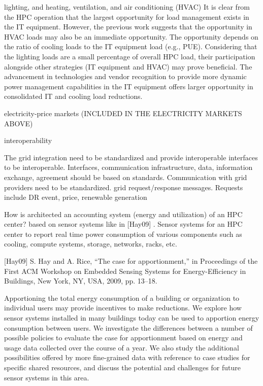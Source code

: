 lighting, and heating, ventilation, and air conditioning (HVAC)
It is clear from the HPC operation that the largest opportunity for load management exists in the IT equipment.
However, the previous work suggests that the opportunity in HVAC loads may also be an immediate opportunity. 
The opportunity depends on the ratio of cooling loads to the IT equipment load (e.g., PUE).
Considering that the lighting loads are a small percentage of overall HPC load, their participation alongside other strategies (IT equipment and HVAC) may prove beneficial. 
The advancement in technologies and vendor recognition to provide more dynamic power management capabilities in the IT equipment offers larger opportunity in consolidated IT and cooling load reductions.

electricity-price markets (INCLUDED IN THE ELECTRICITY MARKETS ABOVE)

interoperability

The grid integration need to be standardized and provide interoperable
interfaces to be interoperable. Interfaces, communication infrastructure,
data, information exchange, agreement should be based on standards.
Communication with grid providers need to be standardized. grid
request/response messages. Requests include DR event, price, renewable
generation


How is architected an accounting system (energy and utilization) of an HPC
center? based on sensor systems like in [Hay09] . Sensor systems for an HPC
center to report real time power consumption of various components such as
cooling, compute systems, storage, networks, racks, etc.

[Hay09] S. Hay and A. Rice, ``The case for apportionment,'' in Proceedings
of the First ACM Workshop on Embedded Sensing Systems for Energy-Efficiency
in Buildings, New York, NY, USA, 2009, pp. 13--18.

Apportioning the total energy consumption of a building or organization to
individual users may provide incentives to make reductions. We explore how
sensor systems installed in many buildings today can be used to apportion
energy consumption between users. We investigate the differences between a
number of possible policies to evaluate the case for apportionment based on
energy and usage data collected over the course of a year. We also study the
additional possibilities offered by more fine-grained data with reference to
case studies for specific shared resources, and discuss the potential and
challenges for future sensor systems in this area.

